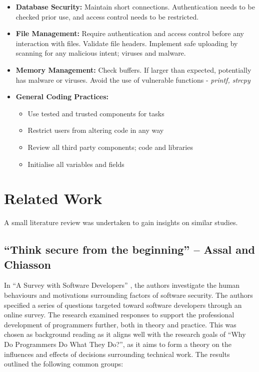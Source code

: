 \begin{itemize}
\item \textbf{Database Security:} Maintain short connections. Authentication needs to be checked prior use, and access control needs to be restricted. 
\item \textbf{File Management:} Require authentication and access control before any interaction with files. Validate file headers. Implement safe uploading by scanning for any malicious intent; viruses and malware. 
\item \textbf{Memory Management:} Check buffers. If larger than expected, potentially has malware or viruses. Avoid the use of vulnerable functions - \textit{printf, strcpy}
\item \textbf{General Coding Practices:}
\begin{itemize}
\item Use tested and trusted components for tasks
\item Restrict users from altering code in any way
\item Review all third party components; code and libraries
\item Initialise all variables and fields
\end{itemize}
\end{itemize}

\newpage
\section{Related Work}

A small literature review was undertaken to gain insights on similar studies.

\subsection{“Think secure from the beginning” – Assal and Chiasson}

In “A Survey with Software Developers” \cite{summary1}, the authors investigate the human behaviours and motivations surrounding factors of software security. The authors specified a series of questions targeted toward software developers through an online survey. The research examined responses to support the professional development of programmers further, both in theory and practice. This was chosen as background reading as it aligns well with the research goals of “Why Do Programmers Do What They Do?”, as it aims to form a theory on the influences and effects of decisions surrounding technical work. 
\newline
\newline
The results outlined the following common groups:

